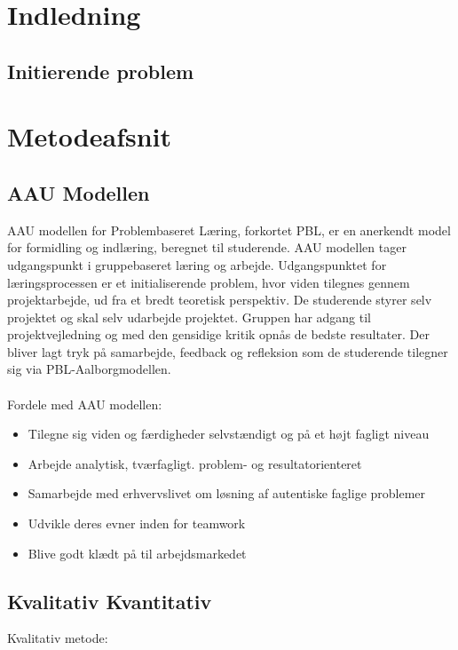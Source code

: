 \documentclass[11pt, twoside, a4paper, openright]{report}
\begin{document}





\tableofcontents

\chapter{Indledning}
	\section{Initierende problem}
	
\chapter{Metodeafsnit}
	\section{AAU Modellen}
	AAU modellen for Problembaseret Læring, forkortet PBL, er en anerkendt model for formidling og indlæring, beregnet til studerende. AAU modellen tager udgangspunkt i gruppebaseret læring og arbejde. Udgangspunktet for læringsprocessen er et initialiserende problem, hvor viden tilegnes gennem projektarbejde, ud fra et bredt teoretisk perspektiv. De studerende styrer selv projektet og skal selv udarbejde projektet. Gruppen har adgang til projektvejledning og med den gensidige kritik opnås de bedste resultater. Der bliver lagt tryk på samarbejde, feedback og refleksion som de studerende tilegner sig via PBL-Aalborgmodellen.
\\\\
Fordele med AAU modellen: 
\begin{itemize}
\item Tilegne sig viden og færdigheder selvstændigt og på et højt fagligt niveau
\item Arbejde analytisk, tværfagligt. problem- og resultatorienteret
\item Samarbejde med erhvervslivet om løsning af autentiske faglige problemer
\item Udvikle deres evner inden for teamwork
\item Blive godt klædt på til arbejdsmarkedet
\end{itemize}

\pagebreak
	\section{Kvalitativ Kvantitativ}
	Kvalitativ metode:
	 
\end{document}
